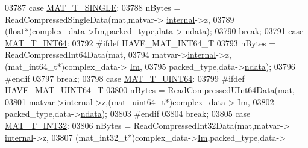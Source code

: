 \begin{DoxyCode}
{{{{{{{{{{{{{{{{{{03787                         \textcolor{keywordflow}{case} \hyperlink{group___m_a_t_ggacf7b3b879282b7ab3a51190e49bf3453a3a3657d40e9212c923d9b9d03531b64c}{MAT\_T\_SINGLE}:
03788                             nBytes = ReadCompressedSingleData(mat,matvar->
      \hyperlink{group___m_a_t_a6e97e3ed9f40c49322c18561c2a94e92}{internal}->z,
03789                                  (\textcolor{keywordtype}{float}*)complex\_data->\hyperlink{group___m_a_t_a7182d10b0d3598415887376065440946}{Im},packed\_type,data->
      \hyperlink{group___m_a_t_a1beb8a8c58a808207cbea650563a9b63}{ndata});
03790                             \textcolor{keywordflow}{break};
03791                         \textcolor{keywordflow}{case} \hyperlink{group___m_a_t_ggacf7b3b879282b7ab3a51190e49bf3453a9e825b5d18b8f946eaf2b4b57e51c145}{MAT\_T\_INT64}:
03792 \textcolor{preprocessor}{#ifdef HAVE\_MAT\_INT64\_T}
03793                             nBytes = ReadCompressedInt64Data(mat,
03794                                 matvar->\hyperlink{group___m_a_t_a6e97e3ed9f40c49322c18561c2a94e92}{internal}->z,(mat\_int64\_t*)complex\_data->
      \hyperlink{group___m_a_t_a7182d10b0d3598415887376065440946}{Im},
03795                                 packed\_type,data->\hyperlink{group___m_a_t_a1beb8a8c58a808207cbea650563a9b63}{ndata});
03796 \textcolor{preprocessor}{#endif}
03797                             \textcolor{keywordflow}{break};
03798                         \textcolor{keywordflow}{case} \hyperlink{group___m_a_t_ggacf7b3b879282b7ab3a51190e49bf3453a45547932c46be27118abe08302d7e29f}{MAT\_T\_UINT64}:
03799 \textcolor{preprocessor}{#ifdef HAVE\_MAT\_UINT64\_T}
03800                             nBytes = ReadCompressedUInt64Data(mat,
03801                                 matvar->\hyperlink{group___m_a_t_a6e97e3ed9f40c49322c18561c2a94e92}{internal}->z,(mat\_uint64\_t*)complex\_data->
      \hyperlink{group___m_a_t_a7182d10b0d3598415887376065440946}{Im},
03802                                 packed\_type,data->\hyperlink{group___m_a_t_a1beb8a8c58a808207cbea650563a9b63}{ndata});
03803 \textcolor{preprocessor}{#endif}
03804                             \textcolor{keywordflow}{break};
03805                         \textcolor{keywordflow}{case} \hyperlink{group___m_a_t_ggacf7b3b879282b7ab3a51190e49bf3453a83e06a68320726c6572bfbb9f3addb1d}{MAT\_T\_INT32}:
03806                             nBytes = ReadCompressedInt32Data(mat,matvar->
      \hyperlink{group___m_a_t_a6e97e3ed9f40c49322c18561c2a94e92}{internal}->z,
03807                                  (mat\_int32\_t*)complex\_data->\hyperlink{group___m_a_t_a7182d10b0d3598415887376065440946}{Im},packed\_type,data->
}}}}}}}}}}}}}}}}}}
\end{DoxyCode}
